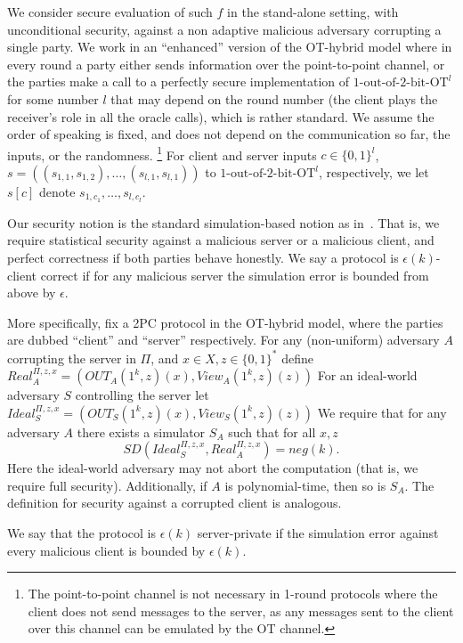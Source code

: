 \documentclass[a4paper]{article}
\newcommand{\OT}[2]{#1\text{-out-of-}#2\text{-bit-OT}}
\begin{document}
We consider secure evaluation of such $f$ in the stand-alone setting, with unconditional security, against a non adaptive malicious adversary corrupting a single party.
We work in an ``enhanced'' version of the OT-hybrid model where in every round a party either sends information over the point-to-point channel, or the parties make a call to a perfectly secure implementation of ${\OT{1}{2}}^l$ for some number $l$ that may depend on the round number (the client plays the receiver's role in all the oracle calls), which is rather standard. We assume the order of speaking is fixed, and does not depend on the communication so far, the inputs, or the randomness.
\footnote{The point-to-point channel is not necessary in 1-round protocols where the client does not send messages to the server, as any messages sent to the client over this channel can be emulated by the OT channel.} 
For client and server inputs $c\in\{0,1\}^l$, $s=((s_{1,1},s_{1,2}),\ldots,(s_{l,1},s_{l,1}))$ to ${\OT{1}{2}}^l$, respectively, we let $s[c]$ denote $s_{1,c_1},\ldots,s_{l,c_l}$.

Our security notion is the standard simulation-based notion as in~\cite{Can00}.
That is, we require statistical security against a malicious server or a malicious client, and perfect correctness if both parties behave honestly.
We say a protocol is $\epsilon(k)$-client correct if for any malicious server the simulation error is bounded from above by $\epsilon$.

More specifically, fix a 2PC protocol in the OT-hybrid model, where the parties are dubbed ``client'' and ``server'' respectively.
For any (non-uniform) adversary $A$ corrupting the server in $\Pi$, and $x\in X,z\in \{0,1\}^*$ define
$Real^{\Pi,z,x}_A=(OUT_A(1^k,z)(x),View_A(1^k,z)(z))$
For an ideal-world adversary $S$ controlling the server let 
$Ideal^{\Pi,z,x}_S=(OUT_S(1^k,z)(x),View_S(1^k,z)(z))$
We require that for any adversary $A$ there exists a simulator 
$S_A$ such that for all $x,z$ 
\[SD(Ideal^{\Pi,z,x}_S,Real^{\Pi,z,x}_A)=neg(k).\]
Here the ideal-world adversary may not abort the computation (that is, we require full security).
Additionally, if $A$ is polynomial-time, then so is $S_A$.
The definition for security against a corrupted client is analogous.

We say that the protocol is $\epsilon(k)$ server-private if the simulation error against every malicious client is bounded by $\epsilon(k)$.
\end{document}

